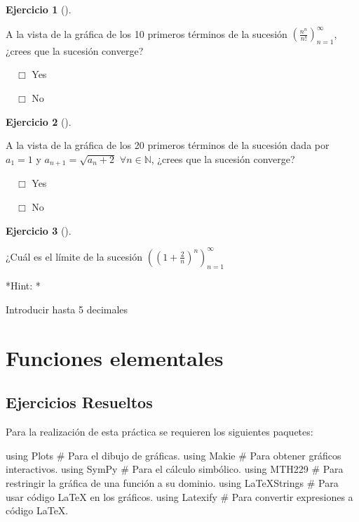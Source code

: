 \documentclass[
  a4paper,
]{scrreport}
\newenvironment{Shaded}{\begin{snugshade}}{\end{snugshade}}
\newcommand{\BuiltInTok}[1]{\textcolor[rgb]{0.00,0.23,0.31}{#1}}
\newcommand{\CommentTok}[1]{\textcolor[rgb]{0.37,0.37,0.37}{#1}}
\newcommand{\ImportTok}[1]{\textcolor[rgb]{0.00,0.46,0.62}{#1}}
\theoremstyle{definition}
\newtheorem{exercise}{Ejercicio}[chapter]
\theoremstyle{remark}
\begin{document}
\begin{exercise}[]\protect\hypertarget{exr-sucesiones-propuesto-5}{}\label{exr-sucesiones-propuesto-5}

A la vista de la gráfica de los 10 primeros términos de la sucesión
\(\left(\frac{n^n}{n!}\right)_{n=1}^\infty\), ¿crees que la sucesión
converge?

${\quad\Box}$ Yes

${\quad\Box}$ No

\end{exercise}

\begin{exercise}[]\protect\hypertarget{exr-sucesiones-propuesto-6}{}\label{exr-sucesiones-propuesto-6}

A la vista de la gráfica de los 20 primeros términos de la sucesión dada
por \(a_1=1\) y \(a_{n+1}=\sqrt{a_n+2}\) \(\forall n\in \mathbb{N}\),
¿crees que la sucesión converge?

${\quad\Box}$ Yes

${\quad\Box}$ No

\end{exercise}

\begin{exercise}[]\protect\hypertarget{exr-sucesiones-propuesto-7}{}\label{exr-sucesiones-propuesto-7}

¿Cuál es el límite de la sucesión
\(\left(\left(1+\frac{2}{n}\right)^n\right)_{n=1}^\infty\)

\vspace{18pt}*Hint: *

Introducir hasta 5 decimales

\end{exercise}


\chapter{Funciones elementales}\label{funciones-elementales}

\section{Ejercicios Resueltos}\label{ejercicios-resueltos-1}

Para la realización de esta práctica se requieren los siguientes
paquetes:

\begin{Shaded}
\begin{Highlighting}[]
\ImportTok{using} \BuiltInTok{Plots}  \CommentTok{\# Para el dibujo de gráficas.}
\ImportTok{using} \BuiltInTok{Makie} \CommentTok{\# Para obtener gráficos interactivos.}
\ImportTok{using} \BuiltInTok{SymPy} \CommentTok{\# Para el cálculo simbólico.}
\ImportTok{using} \BuiltInTok{MTH229} \CommentTok{\# Para restringir la gráfica de una función a su dominio.}
\ImportTok{using} \BuiltInTok{LaTeXStrings}  \CommentTok{\# Para usar código LaTeX en los gráficos.}
\ImportTok{using} \BuiltInTok{Latexify}  \CommentTok{\# Para convertir expresiones a código LaTeX.}
\end{Highlighting}
\end{Shaded}
\end{document}
